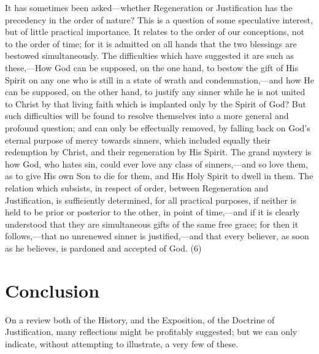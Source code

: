\documentclass[
]{book}
\begin{document}
It has sometimes been asked---whether Regeneration or Justification has the precedency in the order of nature? This is a question of some speculative interest, but of little practical importance. It relates to the order of our conceptions, not to the order of time; for it is admitted on all hands that the two blessings are bestowed simultaneously. The difficulties which have suggested it are such as these,---How God can be supposed, on the one hand, to bestow the gift of His Spirit on any one who is still in a state of wrath and condemnation,---and how He can be supposed, on the other hand, to justify any sinner while he is not united to Christ by that living faith which is implanted only by the Spirit of God? But such difficulties will be found to resolve themselves into a more general and profound question; and can only be effectually removed, by falling back on God's eternal purpose of mercy towards sinners, which included equally their redemption by Christ, and their regeneration by His Spirit. The grand mystery is how God, who hates sin, could ever love any class of sinners,---and so love them, as to give His own Son to die for them, and His Holy Spirit to dwell in them. The relation which subsists, in respect of order, between Regeneration and Justification, is sufficiently determined, for all practical purposes, if neither is held to be prior or posterior to the other, in point of time,---and if it is clearly understood that they are simultaneous gifts of the same free grace; for then it follows,---that no unrenewed sinner is justified,---and that every believer, as soon as he believes, is pardoned and accepted of God. (6)

\hypertarget{conclusion}{%
\chapter{Conclusion}\label{conclusion}}

On a review both of the History, and the Exposition, of the Doctrine of Justification, many reflections might be profitably suggested; but we can only indicate, without attempting to illustrate, a very few of these.
\end{document}
